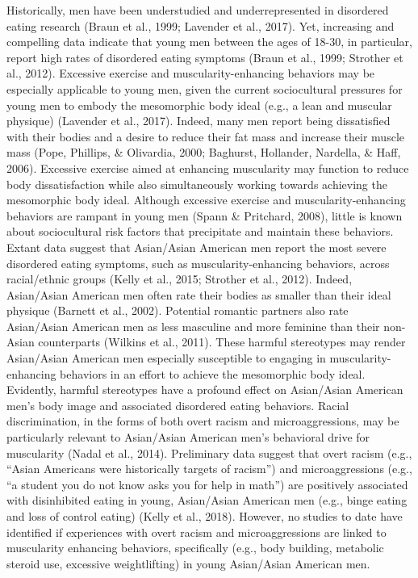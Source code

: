 \documentclass[
  english,
  man, fleqn, noextraspace,floatsintext]{apa6}
\begin{document}
Historically, men have been understudied and underrepresented in disordered eating research (Braun et al., 1999; Lavender et al., 2017). Yet, increasing and compelling data indicate that young men between the ages of 18-30, in particular, report high rates of disordered eating symptoms (Braun et al., 1999; Strother et al., 2012). Excessive exercise and muscularity-enhancing behaviors may be especially applicable to young men, given the current sociocultural pressures for young men to embody the mesomorphic body ideal (e.g., a lean and muscular physique) (Lavender et al., 2017). Indeed, many men report being dissatisfied with their bodies and a desire to reduce their fat mass and increase their muscle mass (Pope, Phillips, \& Olivardia, 2000; Baghurst, Hollander, Nardella, \& Haff, 2006). Excessive exercise aimed at enhancing muscularity may function to reduce body dissatisfaction while also simultaneously working towards achieving the mesomorphic body ideal. Although excessive exercise and muscularity-enhancing behaviors are rampant in young men (Spann \& Pritchard, 2008), little is known about sociocultural risk factors that precipitate and maintain these behaviors.
Extant data suggest that Asian/Asian American men report the most severe disordered eating symptoms, such as muscularity-enhancing behaviors, across racial/ethnic groups (Kelly et al., 2015; Strother et al., 2012). Indeed, Asian/Asian American men often rate their bodies as smaller than their ideal physique (Barnett et al., 2002). Potential romantic partners also rate Asian/Asian American men as less masculine and more feminine than their non-Asian counterparts (Wilkins et al., 2011). These harmful stereotypes may render Asian/Asian American men especially susceptible to engaging in muscularity-enhancing behaviors in an effort to achieve the mesomorphic body ideal.
Evidently, harmful stereotypes have a profound effect on Asian/Asian American men's body image and associated disordered eating behaviors. Racial discrimination, in the forms of both overt racism and microaggressions, may be particularly relevant to Asian/Asian American men's behavioral drive for muscularity (Nadal et al., 2014). Preliminary data suggest that overt racism (e.g., ``Asian Americans were historically targets of racism'') and microaggressions (e.g., ``a student you do not know asks you for help in math'') are positively associated with disinhibited eating in young, Asian/Asian American men (e.g., binge eating and loss of control eating) (Kelly et al., 2018). However, no studies to date have identified if experiences with overt racism and microaggressions are linked to muscularity enhancing behaviors, specifically (e.g., body building, metabolic steroid use, excessive weightlifting) in young Asian/Asian American men.
\end{document}
